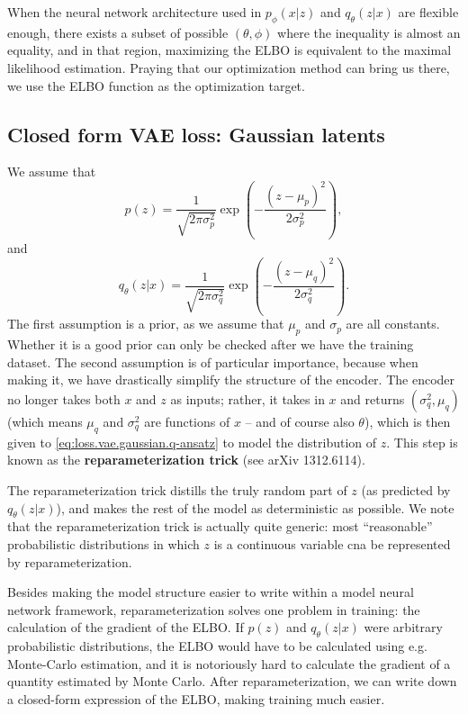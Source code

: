 \documentclass[hyperref, a4paper, 12pt]{report}
\newcommand*{\concept}[1]{{\textbf{#1}}}
\begin{document}
When the neural network architecture used in $p_\phi(x|z)$ and $q_\theta(z|x)$ are flexible enough,
there exists a subset of possible $(\theta, \phi)$ where the inequality is almost an equality,
and in that region, maximizing the ELBO is equivalent to the maximal likelihood estimation.
Praying that our optimization method can bring us there,
we use the ELBO function as the optimization target.

\subsection{Closed form VAE loss: Gaussian latents}

We assume that 
\begin{equation}
    p(z) = \frac{1}{\sqrt{2\pi \sigma_p^2}} \exp(- \frac{(z - \mu_p)^2}{2 \sigma_p^2}),
    \label{eq:loss.vae.gaussian.z-prior}
\end{equation} 
and 
\begin{equation}
    q_\theta(z | x) = \frac{1}{\sqrt{2\pi \sigma_q^2}} \exp(- \frac{(z - \mu_q)^2}{2 \sigma_q^2}).
    \label{eq:loss.vae.gaussian.q-ansatz}
\end{equation}
The first assumption is a prior, as we assume that $\mu_p$ and $\sigma_p$ are all constants.
Whether it is a good prior can only be checked after we have the training dataset.
The second assumption is of particular importance,
because when making it, we have drastically simplify the structure of the encoder.
The encoder no longer takes both $x$ and $z$ as inputs;
rather, it takes in $x$ and returns $(\sigma_q^2, \mu_q)$
(which means $\mu_q$ and $\sigma_q^2$ are functions of $x$ -- and of course also $\theta$),
which is then given to \eqref{eq:loss.vae.gaussian.q-ansatz} to model the distribution of $z$.
This step is known as the \concept{reparameterization trick} (see arXiv 1312.6114).

The reparameterization trick distills the truly random part of $z$ (as predicted by $q_\theta(z|x)$),
and makes the rest of the model as deterministic as possible.
We note that the reparameterization trick is actually quite generic:
most ``reasonable'' probabilistic distributions in which $z$ is a continuous variable
cna be represented by reparameterization.

Besides making the model structure easier to write within a model neural network framework,
reparameterization solves one problem in training:
the calculation of the gradient of the ELBO.
If $p(z)$ and $q_\theta(z|x)$ were arbitrary probabilistic distributions,
the ELBO would have to be calculated using e.g. Monte-Carlo estimation,
and it is notoriously hard to calculate the gradient of a quantity estimated by Monte Carlo.
After reparameterization, we can write down a closed-form expression of the ELBO,
making training much easier.
\end{document}
